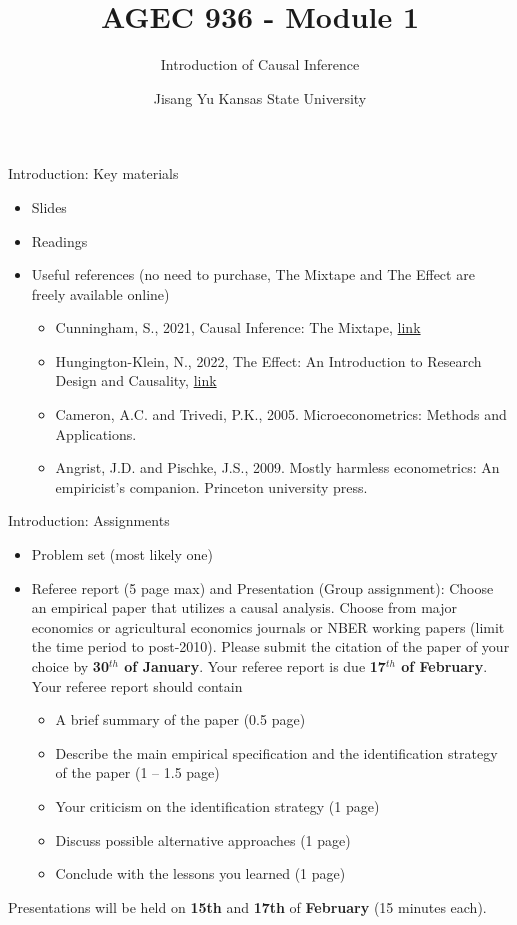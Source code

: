 \documentclass[
  ignorenonframetext,
]{beamer}
\title{AGEC 936 - Module 1}
\subtitle{Introduction of Causal Inference}
\author{Jisang Yu Kansas State University}
\date{}
\providecommand{\tightlist}{%
  \setlength{\itemsep}{0pt}\setlength{\parskip}{0pt}}
\begin{document}
\frame{\titlepage}

\begin{frame}{Introduction: Key materials}
\protect\hypertarget{introduction-key-materials}{}
\begin{itemize}
\item
  Slides
\item
  Readings
\item
  Useful references (no need to purchase, The Mixtape and The Effect are
  freely available online)

  \begin{itemize}
  \tightlist
  \item
    Cunningham, S., 2021, Causal Inference: The Mixtape,
    \href{https://mixtape.scunning.com/}{link}
  \item
    Hungington-Klein, N., 2022, The Effect: An Introduction to Research
    Design and Causality, \href{https://theeffectbook.net/}{link}
  \item
    Cameron, A.C. and Trivedi, P.K., 2005. Microeconometrics: Methods
    and Applications.\\
  \item
    Angrist, J.D. and Pischke, J.S., 2009. Mostly harmless econometrics:
    An empiricist's companion. Princeton university press.
  \end{itemize}
\end{itemize}
\end{frame}

\begin{frame}{Introduction: Assignments}
\protect\hypertarget{introduction-assignments}{}
\begin{itemize}
\item
  Problem set (most likely one)
\item
  Referee report (5 page max) and Presentation (Group assignment):
  Choose an empirical paper that utilizes a causal analysis. Choose from
  major economics or agricultural economics journals or NBER working
  papers (limit the time period to post-2010). Please submit the
  citation of the paper of your choice by \textbf{30\(^{th}\) of
  January}. Your referee report is due \textbf{17\(^{th}\) of February}.
  Your referee report should contain

  \begin{itemize}
  \tightlist
  \item
    A brief summary of the paper (0.5 page)
  \item
    Describe the main empirical specification and the identification
    strategy of the paper (1 -- 1.5 page)
  \item
    Your criticism on the identification strategy (1 page)
  \item
    Discuss possible alternative approaches (1 page)
  \item
    Conclude with the lessons you learned (1 page)
  \end{itemize}
\end{itemize}

Presentations will be held on \textbf{15th} and \textbf{17th} of
\textbf{February} (15 minutes each).
\end{frame}
\end{document}
